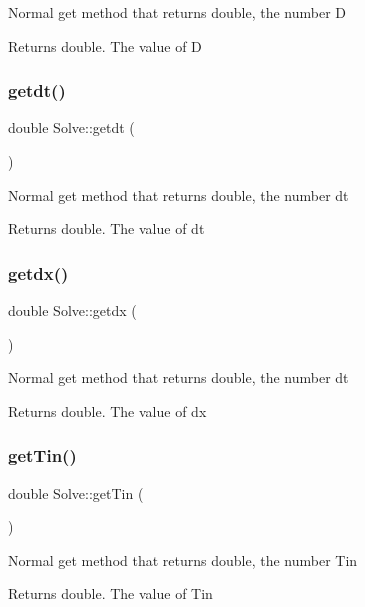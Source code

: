 Normal get method that returns double, the number D \begin{DoxyReturn}{Returns}
double. The value of D 
\end{DoxyReturn}
\mbox{\label{class_solve_a981e11c3c390bc54041a8e60ebdcc4bf}} 
\subsubsection{\texorpdfstring{getdt()}{getdt()}}
{\footnotesize\ttfamily double Solve\+::getdt (\begin{DoxyParamCaption}{ }\end{DoxyParamCaption})}

Normal get method that returns double, the number dt \begin{DoxyReturn}{Returns}
double. The value of dt 
\end{DoxyReturn}
\mbox{\label{class_solve_aad066a37070623f3c1bfb5f001fd2a50}} 
\subsubsection{\texorpdfstring{getdx()}{getdx()}}
{\footnotesize\ttfamily double Solve\+::getdx (\begin{DoxyParamCaption}{ }\end{DoxyParamCaption})}

Normal get method that returns double, the number dt \begin{DoxyReturn}{Returns}
double. The value of dx 
\end{DoxyReturn}
\mbox{\label{class_solve_a7d9d481ed1bf8bbfc5bf37517e2a12c6}} 
\subsubsection{\texorpdfstring{get\+Tin()}{getTin()}}
{\footnotesize\ttfamily double Solve\+::get\+Tin (\begin{DoxyParamCaption}{ }\end{DoxyParamCaption})}

Normal get method that returns double, the number Tin \begin{DoxyReturn}{Returns}
double. The value of Tin 
\end{DoxyReturn}
\mbox{\label{class_solve_afad3694fc830b80135a316eea2c0c279}} 
